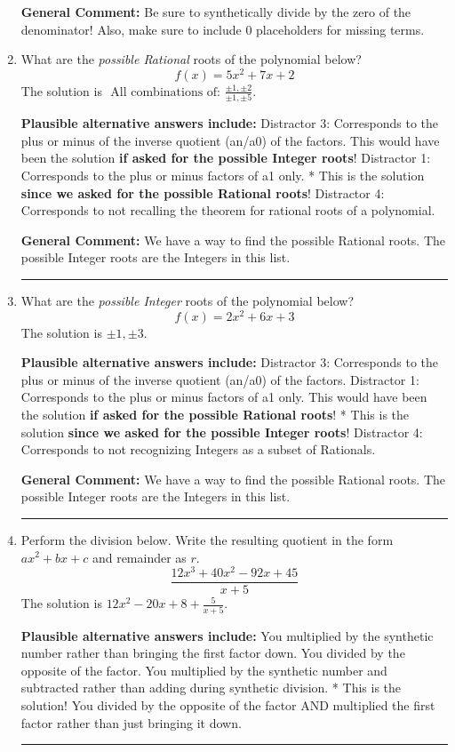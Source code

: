 \documentclass{extbook}[14pt]
\newcommand{\litem}[1]{\item #1

\rule{\textwidth}{0.4pt}}
\begin{document}
\begin{enumerate}
{\textbf{General Comment:} Be sure to synthetically divide by the zero of the denominator! Also, make sure to include 0 placeholders for missing terms.
}
\litem{
What are the \textit{possible Rational} roots of the polynomial below?
\[ f(x) = 5x^{2} +7 x + 2 \]The solution is \( \text{ All combinations of: }\frac{\pm 1,\pm 2}{\pm 1,\pm 5} \).\begin{enumerate}[label=\Alph*.]
\textbf{Plausible alternative answers include:} Distractor 3: Corresponds to the plus or minus of the inverse quotient (an/a0) of the factors. 
This would have been the solution \textbf{if asked for the possible Integer roots}!
 Distractor 1: Corresponds to the plus or minus factors of a1 only.
* This is the solution \textbf{since we asked for the possible Rational roots}!
 Distractor 4: Corresponds to not recalling the theorem for rational roots of a polynomial.
\end{enumerate}

\textbf{General Comment:} We have a way to find the possible Rational roots. The possible Integer roots are the Integers in this list.
}
\litem{
What are the \textit{possible Integer} roots of the polynomial below?
\[ f(x) = 2x^{2} +6 x + 3 \]The solution is \( \pm 1,\pm 3 \).\begin{enumerate}[label=\Alph*.]
\textbf{Plausible alternative answers include:} Distractor 3: Corresponds to the plus or minus of the inverse quotient (an/a0) of the factors. 
 Distractor 1: Corresponds to the plus or minus factors of a1 only.
This would have been the solution \textbf{if asked for the possible Rational roots}!
* This is the solution \textbf{since we asked for the possible Integer roots}!
 Distractor 4: Corresponds to not recognizing Integers as a subset of Rationals.
\end{enumerate}

\textbf{General Comment:} We have a way to find the possible Rational roots. The possible Integer roots are the Integers in this list.
}
\litem{
Perform the division below. Write the resulting quotient in the form $ax^2+bx+c$ and remainder as $r$.
\[ \frac{12x^{3} +40 x^{2} -92 x + 45}{x + 5} \]The solution is \( 12x^{2} -20 x + 8 + \frac{5}{x + 5} \).\begin{enumerate}[label=\Alph*.]
\textbf{Plausible alternative answers include:} You multiplied by the synthetic number rather than bringing the first factor down.
 You divided by the opposite of the factor.
 You multiplied by the synthetic number and subtracted rather than adding during synthetic division.
* This is the solution!
 You divided by the opposite of the factor AND multiplied the first factor rather than just bringing it down.
\end{enumerate}

}
\end{enumerate}
\end{document}
